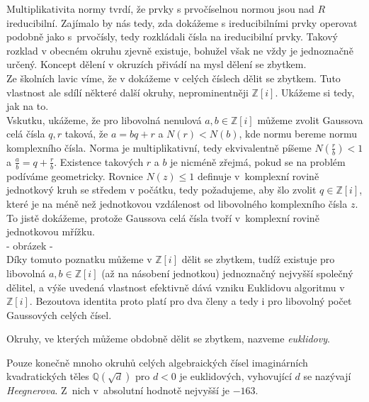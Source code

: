 \documentclass [12pt]{report}
\begin{document}
Multiplikativita normy tvrdí, že prvky s prvočíselnou normou jsou nad $R$ ireducibilní. Zajímalo by nás tedy, zda dokážeme s ireducibilními prvky operovat podobně jako s~prvočísly, tedy rozkládali čísla na ireducibilní prvky. Takový rozklad v obecném okruhu zjevně existuje, bohužel však ne vždy je jednoznačně určený. Koncept dělení v okruzích přivádí na mysl dělení se zbytkem.\\

Ze školních lavic víme, že v dokážeme v celých číslech dělit se zbytkem. Tuto vlastnost ale sdílí některé další okruhy, neprominentněji $\mathbb{Z}[i]$. Ukážeme si tedy, jak na to.\\

Vskutku, ukážeme, že pro libovolná nenulová $a,b \in \mathbb{Z}[i]$ můžeme zvolit Gaussova celá čísla $q,r$ taková, že $a = bq+r$ a $N(r) < N(b)$, kde normu bereme normu komplexního čísla.  Norma je multiplikativní, tedy ekvivalentně píšeme $N\left(\frac{r}{b}\right) < 1$ a $\frac{a}{b} = q+\frac{r}{b}$. Existence takových $r$ a $b$ je nicméně zřejmá, pokud se na problém podíváme geometricky. Rovnice $N(z) \leqslant 1$ definuje v~komplexní rovině jednotkový kruh se středem v počátku, tedy požadujeme, aby šlo zvolit $q \in \mathbb{Z}[i]$, které je na méně než jednotkovou vzdálenost od libovolného komplexního čísla $z$. To jistě dokážeme, protože Gaussova celá čísla tvoří v~komplexní rovině jednotkovou mřížku.\\

- obrázek -\\

Díky tomuto poznatku můžeme v $\mathbb{Z}[i]$ dělit se zbytkem, tudíž existuje pro libovolná $a,b  \in \mathbb{Z}[i]$ (až na násobení jednotkou) jednoznačný nejvyšší společný dělitel, a výše uvedená vlastnost efektivně dává vzniku Euklidovu algoritmu v $\mathbb{Z}[i]$. Bezoutova identita proto platí pro dva členy a tedy i pro libovolný počet Gaussových celých čísel.
\begin{definice}
Okruhy, ve kterých můžeme obdobně dělit se zbytkem, nazveme \textit{euklidovy}.
\end{definice}

\begin{poznamka}
Pouze konečně mnoho okruhů celých algebraických čísel imaginárních kvadratických těles $\mathbb{Q}(\sqrt{d})$ pro $d<0$ je euklidových, vyhovující $d$ se nazývají \textit{Heegnerova}. Z~nich v~absolutní hodnotě nejvyšší je $-163$.
\end{poznamka}
\end{document}
